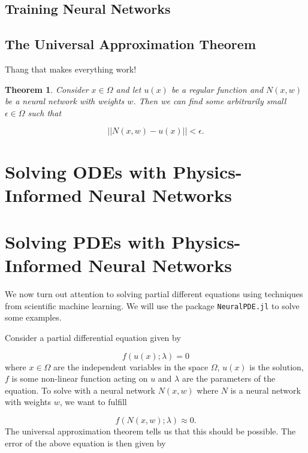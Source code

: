 \documentclass{CUP-JNL-DTM}%
\newtheorem{theorem}{Theorem}[section]
\theoremstyle{definition}
\numberwithin{equation}{section}
\begin{document}
\subsection{Training Neural Networks}

\subsection{The Universal Approximation Theorem}

Thang that makes everything work!

\begin{theorem}

Consider $x \in \Omega$ and let $u(x)$ be a regular function and $N(x,w)$ be a neural network with weights $w$. Then we can find some arbitrarily small $\epsilon \in \Omega$ such that 

\begin{equation}
	||N(x,w) - u(x)|| < \epsilon. 
\end{equation}

\end{theorem}

\section{Solving ODEs with Physics-Informed Neural Networks}

\section{Solving PDEs with Physics-Informed Neural Networks}

We now turn out attention to solving partial different equations using techniques from scientific machine learning. We will use the package \texttt{NeuralPDE.jl} \cite{zubovNeuralPDEAutomatingPhysicsInformed2021} to solve some examples. 

Consider a partial differential equation given by 

\begin{equation}
	f(u(x); \lambda) = 0
\end{equation}
where $x \in \Omega$ are the independent variables in the space $\Omega$, $u(x)$ is the solution, $f$ is some non-linear function acting on $u$ and $\lambda$ are the parameters of the equation. To solve with a neural network $N(x, w)$ where $N$ is a neural network with weights $w$, we want to fulfill 

\begin{equation}
	f(N(x, w); \lambda) \approx 0.
	\label{eqn:NNapprox}
\end{equation}
The universal approximation theorem tells us that this should be possible. The error of the above equation is then given by 
\end{document}
